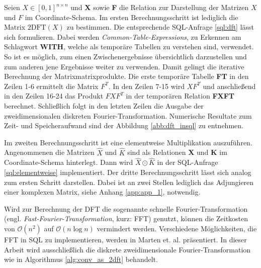 Seien $X \in [0,1]^{n \times n}$ und \textbf{X} sowie \textbf{F} die Relation zur Darstellung der Matrizen $X$ und $F$ im Coordinate-Schema. Im ersten Berechnungsschritt ist lediglich die Matrix $\mathrm{2DFT}(X)$ zu bestimmen. Die entsprechende SQL-Anfrage \ref{sql:dft} lässt sich formulieren. Dabei werden \textit{Common-Table-Expressions}, zu Erkennen am Schlagwort \textbf{WITH}, welche als temporäre Tabellen zu verstehen sind, verwendet. So ist es möglich, zum einen Zwischenergebnisse übersichtlich darzustellen und zum anderen jene Ergebnisse weiter zu verwenden. Damit gelingt die iterative Berechnung der Matrixmatrixprodukte. Die erste temporäre Tabelle \textbf{FT}
in den Zeilen 1-6 ermittelt die Matrix $F^T$. In den Zeilen 7-15 wird $X F^T$ und anschließend in den Zeilen 16-24 das Produkt $F X F^T$ in der temporären Relation \textbf{FXFT} berechnet. 
Schließlich folgt in den letzten Zeilen die Ausgabe der zweidimensionalen diskreten Fourier-Transformation. Numerische Resultate zum Zeit- und Speicheraufwand sind der Abbildung \ref{abb:dft_insql} zu entnehmen.

\noindent \begin{minipage}{\linewidth}
    
\end{minipage}

Im zweiten Berechnungsschritt ist eine elementweise Multiplikation auszuführen. Angenommenen die Matrizen $\hat{X}$ und $\hat{K}$ sind als Relationen \textbf{X}
und \textbf{K} im Coordinate-Schema hinterlegt. Dann wird $\hat{X} \odot \hat{K}$ in der SQL-Anfrage \ref{sql:elementweise} implementiert.
Der dritte Berechnungsschritt lässt sich analog zum ersten Schritt darstellen. Dabei ist an zwei Stellen lediglich das Adjungieren einer komplexen Matrix, siehe Anhang \ref{app:app_1}, notwendig.



Wird zur Berechnung der DFT die sogenannte schnelle Fourier-Transformation (engl. \textit{Fast-Fourier-Transformation}, kurz: FFT) genutzt, können die Zeitkosten von $\mathcal{O}(n^2)$ auf $\mathcal{O}(n \log n)$ vermindert werden. Verschiedene Möglichkeiten, die FFT in SQL zu implementieren, werden in Marten et. al.\cite{DBLP:conf/adbis/Marten0019} präsentiert. In dieser Arbeit wird ausschließlich die diskrete zweidimensionale Fourier-Transformation wie in Algorithmus \ref{alg:conv_as_2dft} behandelt. 


